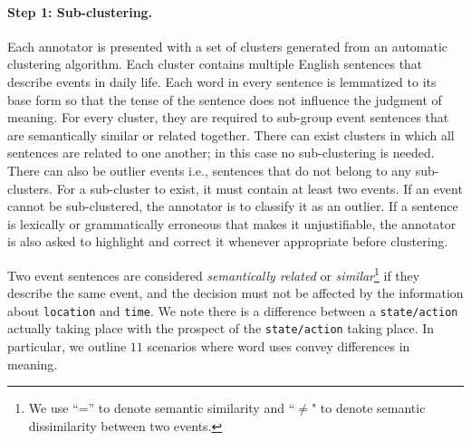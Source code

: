\paragraph{Step 1: Sub-clustering.}
Each annotator is presented with a set of clusters generated from an automatic clustering algorithm. Each cluster contains multiple English sentences that describe events in daily life. Each word in every sentence is lemmatized to its base form so that the tense of the sentence does not influence the judgment of meaning. For every cluster, they are required to sub-group event sentences that are semantically similar or related together. There can exist clusters in which all sentences are related to one another; in this case no sub-clustering is needed. There can also be outlier events i.e., sentences that do not belong to any sub-clusters. For a sub-cluster to exist, it must contain at least two events. If an event cannot be sub-clustered, the annotator is to classify it as an outlier.	If a sentence is lexically or grammatically erroneous that makes it unjustifiable, the annotator is also asked to highlight and correct it whenever appropriate before clustering. 


Two event sentences are considered \textit{semantically related} or \textit{similar}\footnote{We use ``='' to denote semantic similarity and ``$\ne$" to denote semantic dissimilarity between two events.} if they describe the same event, and the decision must not be affected by the information about \texttt{location} and \texttt{time}. We note there is a difference between a \texttt{state/action} actually taking place with the prospect of the \texttt{state/action} taking place. In particular, we outline $11$ scenarios where word uses convey differences in meaning.	

